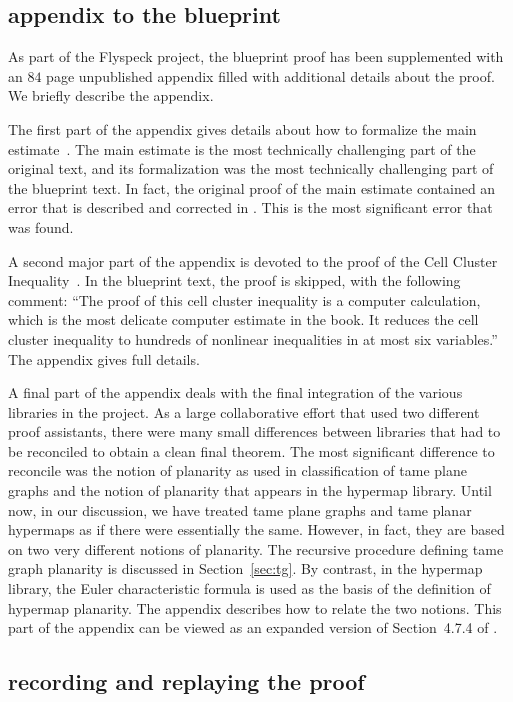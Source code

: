 \subsection{appendix to the blueprint}\label{sec:ab}

As part of the Flyspeck project, the blueprint proof has been
supplemented with an $84$ page unpublished appendix filled with
additional details about the proof.   We briefly describe the
appendix.

The first part of the appendix gives details about how to formalize
the main estimate~\cite[Sec~7.4]{DSP}.  The main estimate is the most
technically challenging part of the original text, and its
formalization was the most technically challenging part of the
blueprint text.  In fact, the original proof of the main estimate
contained an error that is described and corrected in \cite{HalesHMNOZ10}.
This is the most significant error that was found.

A second major part of the appendix is devoted to the proof of the
Cell Cluster Inequality~\cite[Thm~6.93]{DSP}.   In the blueprint text, the proof is
skipped, with the following comment: ``The proof of this cell cluster
inequality is a computer calculation, which is the most delicate
computer estimate in the book.  It reduces the cell cluster inequality
to hundreds of nonlinear inequalities in at most six variables.''
The appendix gives full details.

A final part of the appendix deals with the final integration of the
various libraries in the project.  As a large collaborative effort
that used two different proof assistants, there were many small
differences between libraries that had to be reconciled to obtain a
clean final theorem.  The most significant difference to reconcile was
the notion of planarity as used in classification of tame plane graphs
and the notion of planarity that appears in the hypermap library.
Until now, in our discussion, we have treated tame plane graphs and
tame planar hypermaps as if there were essentially the same.  However, in
fact, they are based on two very different notions of planarity.  The
recursive procedure defining tame graph planarity is discussed in
Section~\ref{sec:tg}.  By contrast, in the hypermap library, the Euler
characteristic formula is used as the basis of the definition of
hypermap planarity.  The appendix describes how to relate the two
notions.  This part of the appendix can be viewed as an expanded
version of Section~4.7.4 of \cite{DSP}.


\subsection{recording and replaying the proof}\label{sec:rec}

